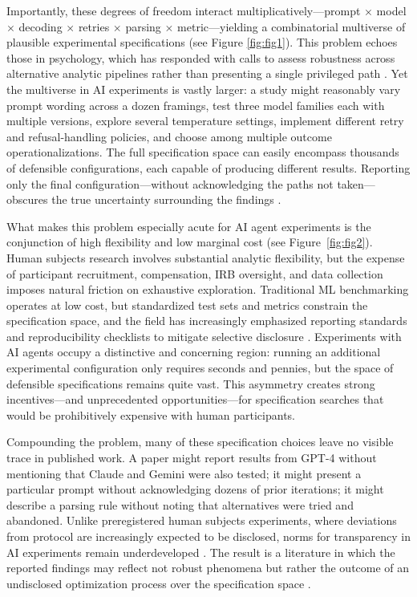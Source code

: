 \documentclass{article}
\theoremstyle{plain}
\theoremstyle{definition}
\theoremstyle{remark}
\begin{document}
Importantly, these degrees of freedom interact multiplicatively---prompt $\times$ model $\times$ decoding $\times$ retries $\times$ parsing $\times$ metric---yielding a combinatorial multiverse of plausible experimental specifications (see Figure \ref{fig:fig1}). This problem echoes those in psychology, which has responded with calls to assess robustness across alternative analytic pipelines rather than presenting a single privileged path \citep{steegen2016multiverse}. Yet the multiverse in AI experiments is vastly larger: a study might reasonably vary prompt wording across a dozen framings, test three model families each with multiple versions, explore several temperature settings, implement different retry and refusal-handling policies, and choose among multiple outcome operationalizations. The full specification space can easily encompass thousands of defensible configurations, each capable of producing different results. Reporting only the final configuration---without acknowledging the paths not taken---obscures the true uncertainty surrounding the findings \citep{steegen2016multiverse,simonsohn2020specificationcurve,botviniknezer2020variability}.

What makes this problem especially acute for AI agent experiments is the conjunction of high flexibility and low marginal cost (see Figure~\ref{fig:fig2}). Human subjects research involves substantial analytic flexibility, but the expense of participant recruitment, compensation, IRB oversight, and data collection imposes natural friction on exhaustive exploration. Traditional ML benchmarking operates at low cost, but standardized test sets and metrics constrain the specification space, and the field has increasingly emphasized reporting standards and reproducibility checklists to mitigate selective disclosure \citep{pineau2021reproducibility,mitchell2019modelcards}. Experiments with AI agents occupy a distinctive and concerning region: running an additional experimental configuration only requires seconds and pennies, but the space of defensible specifications remains quite vast. This asymmetry creates strong incentives---and unprecedented opportunities---for specification searches that would be prohibitively expensive with human participants. 

Compounding the problem, many of these specification choices leave no visible trace in published work. A paper might report results from GPT-4 without mentioning that Claude and Gemini were also tested; it might present a particular prompt without acknowledging dozens of prior iterations; it might describe a parsing rule without noting that alternatives were tried and abandoned. Unlike preregistered human subjects experiments, where deviations from protocol are increasingly expected to be disclosed, norms for transparency in AI experiments remain underdeveloped \citep{gundersen2018state}. The result is a literature in which the reported findings may reflect not robust phenomena but rather the outcome of an undisclosed optimization process over the specification space \citep{gelman2013forkingpaths, simmons2011falsepositive}.
\end{document}
